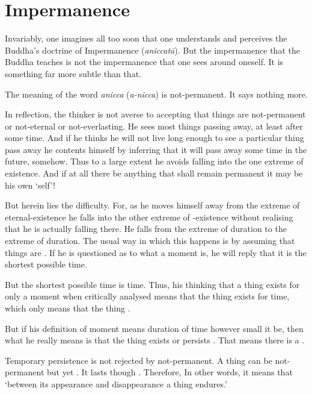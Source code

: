 \chapter{Impermanence}

Invariably, one imagines all too soon that one understands and perceives the Buddha's doctrine of Impermanence (\emph{aniccatā}). But the impermanence that the Buddha teaches is not the impermanence that one sees around oneself. It is something far more subtle than that.

The meaning of the word \emph{anicca} (\emph{a-nicca}) is not-permanent. It says nothing more.

In reflection, the thinker is not averse to accepting that things are not-permanent or not-eternal or not-everlasting. He sees most things passing away, at least after some time. And if he thinks he will not live long enough to see a particular thing pass away he contents himself by inferring that it will pass away some time in the future, somehow. Thus to a large extent he avoids falling into the one extreme of  existence. And if at all there be anything that shall remain permanent it may be his own `self'!

But herein lies the difficulty. For, as he moves himself away from the extreme of eternal-existence he falls into the other extreme of -existence without realising that he is actually falling there. He falls from the extreme of  duration to the extreme of  duration. The usual way in which this happens is by assuming that things are . If he is questioned as to what a moment is, he will reply that it is the shortest possible time.

But the shortest possible time is  time. Thus, his thinking that a thing exists for only a moment when critically analysed means that the thing exists for  time, which only means that the thing .

But if his definition of moment means  duration of time however small it be, then what he really means is that the thing exists or persists . That means there is a .

Temporary persistence is not rejected by not-permanent. A thing can be not-permanent but yet . It lasts  though . Therefore,  In other words, it means that `between its appearance and disappearance a thing endures.'

